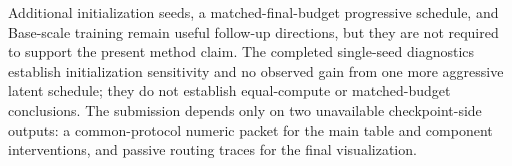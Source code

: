 Additional initialization seeds, a matched-final-budget progressive schedule,
and Base-scale training remain useful follow-up directions, but they are not
required to support the present method claim. The completed single-seed
diagnostics establish initialization sensitivity and no observed gain from one
more aggressive latent schedule; they do not establish equal-compute or
matched-budget conclusions. The submission depends only on two unavailable
checkpoint-side outputs: a common-protocol numeric packet for the main table
and component interventions, and passive routing traces for the final
visualization.
